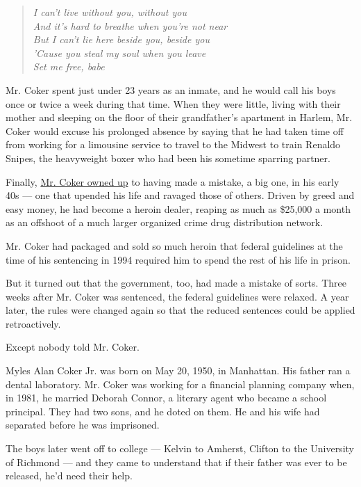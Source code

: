 \begin{quote}
\emph{I can't live without you, without you}\\
\emph{And it's hard to breathe when you're not near}\\
\emph{But I can't lie here beside you, beside you}\\
\emph{'Cause you steal my soul when you leave}\\
\emph{Set me free, babe}
\end{quote}

Mr. Coker spent just under 23 years as an inmate, and he would call his
boys once or twice a week during that time. When they were little,
living with their mother and sleeping on the floor of their
grandfather's apartment in Harlem, Mr. Coker would excuse his prolonged
absence by saying that he had taken time off from working for a
limousine service to travel to the Midwest to train Renaldo Snipes, the
heavyweight boxer who had been his sometime sparring partner.

Finally,
\href{https://www.nytimes.com/2014/01/29/nyregion/greed-just-took-me-recalls-a-father-who-led-a-secret-life-of-crime.html}{Mr.
Coker owned up} to having made a mistake, a big one, in his early 40s
--- one that upended his life and ravaged those of others. Driven by
greed and easy money, he had become a heroin dealer, reaping as much as
\$25,000 a month as an offshoot of a much larger organized crime drug
distribution network.

Mr. Coker had packaged and sold so much heroin that federal guidelines
at the time of his sentencing in 1994 required him to spend the rest of
his life in prison.

But it turned out that the government, too, had made a mistake of sorts.
Three weeks after Mr. Coker was sentenced, the federal guidelines were
relaxed. A year later, the rules were changed again so that the reduced
sentences could be applied retroactively.

Except nobody told Mr. Coker.

Myles Alan Coker Jr. was born on May 20, 1950, in Manhattan. His father
ran a dental laboratory. Mr. Coker was working for a financial planning
company when, in 1981, he married Deborah Connor, a literary agent who
became a school principal. They had two sons, and he doted on them. He
and his wife had separated before he was imprisoned.

The boys later went off to college --- Kelvin to Amherst, Clifton to the
University of Richmond --- and they came to understand that if their
father was ever to be released, he'd need their help.

